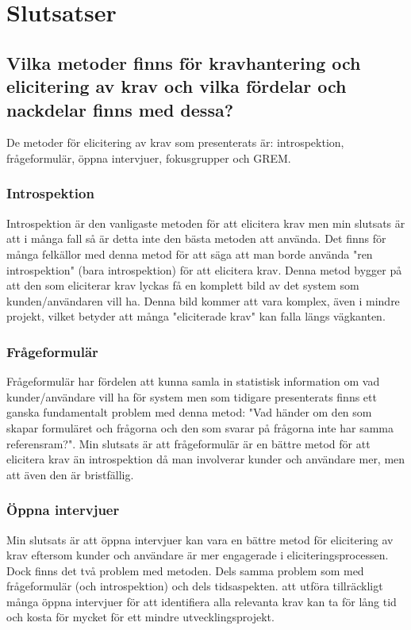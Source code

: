 \section{Slutsatser}
\label{sec:conclusions-jannering}
\subsection{Vilka metoder finns för kravhantering och elicitering av krav och vilka fördelar och nackdelar finns med dessa?}
De metoder för elicitering av krav som presenterats är: introspektion, frågeformulär, öppna intervjuer, fokusgrupper och GREM.

\subsubsection{Introspektion}
Introspektion är den vanligaste metoden för att elicitera krav men min slutsats är att i många fall så är detta inte den bästa metoden att använda. Det finns för många felkällor med denna metod för att säga att man borde använda "ren introspektion" (bara introspektion) för att elicitera krav. Denna metod bygger på att den som eliciterar krav lyckas få en komplett bild av det system som kunden/användaren vill ha. Denna bild kommer att vara komplex, även i mindre projekt, vilket betyder att många "eliciterade krav" kan falla längs vägkanten.

\subsubsection{Frågeformulär}
Frågeformulär har fördelen att kunna samla in statistisk information om vad kunder/användare vill ha för system men som tidigare presenterats finns ett ganska fundamentalt problem med denna metod: "Vad händer om den som skapar formuläret och frågorna och den som svarar på frågorna inte har samma referensram?". Min slutsats är att frågeformulär är en bättre metod för att elicitera krav än introspektion då man involverar kunder och användare mer, men att även den är bristfällig.

\subsubsection{Öppna intervjuer}
Min slutsats är att öppna intervjuer kan vara en bättre metod för elicitering av krav eftersom kunder och användare är mer engagerade i eliciteringsprocessen. Dock finns det två problem med metoden. Dels samma problem som med frågeformulär (och introspektion) och dels tidsaspekten. att utföra tillräckligt många öppna intervjuer för att identifiera alla relevanta krav kan ta för lång tid och kosta för mycket för ett mindre utvecklingsprojekt.


